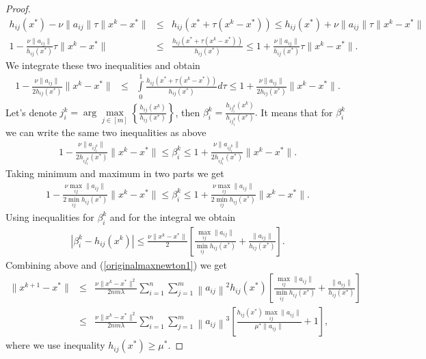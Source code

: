 \documentclass[12pt]{article}
\newcommand{\newalpha}{h}
\begin{document}
\begin{proof}
\begin{eqnarray*}
		\newalpha_{ij}(x^*) - \nu\|a_{ij}\|\tau\|x^k-x^*\| &\leq& \newalpha_{ij}(x^*+\tau(x^k-x^*)) \leq \newalpha_{ij}(x^*)+\nu\|a_{ij}\|\tau\|x^k-x^*\|\\
		1 - \frac{\nu\|a_{ij}\|}{\newalpha_{ij}(x^*)}\tau\|x^k-x^*\| &\leq& \frac{\newalpha_{ij}(x^*+\tau(x^k-x^*))}{\newalpha_{ij}(x^*)} \leq 1 + \frac{\nu\|a_{ij}\|}{\newalpha_{ij}(x^*)}\tau\|x^k-x^*\|.
	\end{eqnarray*} 
	We integrate these two inequalities and obtain
	\begin{eqnarray*}
		1 - \frac{\nu\|a_{ij}\|}{2\newalpha_{ij}(x^*)}\|x^k-x^*\| &\leq& \int\limits_0^1\frac{\newalpha_{ij}(x^*+\tau(x^k-x^*))}{\newalpha_{ij}(x^*)}d\tau \leq 1 + \frac{\nu\|a_{ij}\|}{2\newalpha_{ij}(x^*)}\|x^k-x^*\|.
	\end{eqnarray*}
	Let's denote $j_i^k =\arg \max\limits_{j\in[m]}\left\{\frac{\newalpha_{ij}(x^k)}{\newalpha_{ij}(x^*)}\right\}$, then $\beta_i^k = \frac{\newalpha_{ij^k_i}(x^k)}{\newalpha_{ij^k_i}(x^*)}.$ It means that for $\beta_i^k$ we can write the same two inequalities as above
	\begin{eqnarray*}
		1 - \frac{\nu\|a_{ij_i^k}\|}{2\newalpha_{ij_i^k}(x^*)}\|x^k-x^*\| \leq \beta_i^k \leq 1+ \frac{\nu\|a_{ij_i^k}\|}{2\newalpha_{ij_i^k}(x^*)}\|x^k-x^*\|.
	\end{eqnarray*}
	Taking minimum and maximum in two parts we get
	\begin{eqnarray*}
		1 - \frac{\nu\max\limits_{ij}\|a_{ij}\|}{2\min\limits_{ij}\newalpha_{ij}(x^*)}\|x^k-x^*\| \leq \beta_i^k \leq 1 + \frac{\nu\max\limits_{ij}\|a_{ij}\|}{2\min\limits_{ij}\newalpha_{ij}(x^*)}\|x^k-x^*\|.
	\end{eqnarray*}
	Using inequalities for $\beta_i^k$ and for the integral we obtain
	\begin{eqnarray*}
		\left|\beta_i^k-\newalpha_{ij}(x^k)\right| \leq \frac{\nu\|x^k-x^*\|}{2}\left[\frac{\max\limits_{ij}\|a_{ij}\|}{\min\limits_{ij}\newalpha_{ij}(x^*)}+ \frac{\|a_{ij}\|}{\newalpha_{ij}(x^*)}\right].
	\end{eqnarray*}
	Combining above and (\ref{originalmaxnewton1}) we get
	\begin{eqnarray*}
		\|x^{k+1}-x^*\| &\leq&  \frac{\nu\|x^k-x^*\|^2}{2nm\lambda}\sum\limits_{i=1}^n\sum\limits_{j=1}^m\left\|a_{ij}\right\|^2\newalpha_{ij}(x^*)\left[\frac{\max\limits_{ij}\|a_{ij}\|}{\min\limits_{ij}\newalpha_{ij}(x^*)}+ \frac{\|a_{ij}\|}{\newalpha_{ij}(x^*)}\right]\\
		&\leq& \frac{\nu\|x^k-x^*\|^2}{2nm\lambda}\sum\limits_{i=1}^n\sum\limits_{j=1}^m\left\|a_{ij}\right\|^3\left[\frac{\newalpha_{ij}(x^*)\max\limits_{ij}\|a_{ij}\|}{\mu^*\|a_{ij}\|}+ 1\right],
	\end{eqnarray*}
	where we use inequality $\newalpha_{ij}(x^*) \geq \mu^*$.
\end{proof}
\end{document}
